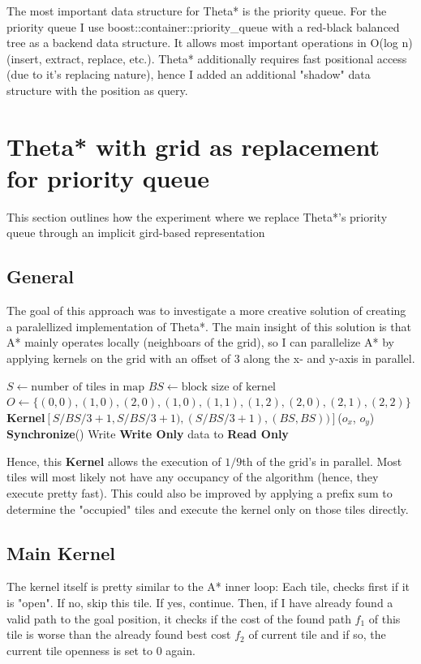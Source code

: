 \documentclass{article}
\begin{document}
The most important data structure for Theta* is the priority queue. For the priority queue I use boost::container::priority\_queue with a red-black balanced tree as a backend data structure. It allows most important operations in O(log n) (insert, extract, replace, etc.). Theta* additionally requires fast positional access (due to it's replacing nature), hence I added an additional "shadow" data structure with the position as query.
%
\section{Theta* with grid as replacement for priority queue}
%
This section outlines how the experiment where we replace Theta*'s priority queue through an implicit gird-based representation
%
\subsection{General}
The goal of this approach was to investigate a more creative solution of creating a paralellized implementation of Theta*. The main insight of this solution is that A* mainly operates locally (neighboars of the grid), so I can parallelize A* by applying kernels on the grid with an offset of 3 along the x- and y-axis in parallel.
\begin{algorithmic}

\State $S \gets \text {number of tiles in map}$
\State $BS \gets \text {block size of kernel}$
\State $O \gets \{(0, 0), (1,0), (2,0), (1,0), (1,1), (1,2), (2,0), (2,1), (2,2)\}$
\State \textbf{Kernel}$[S/BS/3+1, S/BS/3+1), (S / BS / 3 + 1),(BS, BS))]$($o_x$, $o_y$)
\State \textbf{Synchronize}()
\EndFor
\State Write \textbf{Write Only} data to \textbf{Read Only}
\EndWhile
\end{algorithmic}
Hence, this \textbf{Kernel} allows the execution of $1/9$th of the grid's in parallel. Most tiles will most likely not have any occupancy of the algorithm (hence, they execute pretty fast). This could also be improved by applying a prefix sum to determine the "occupied" tiles and execute the kernel only on those tiles directly.
%
\subsection{Main Kernel}
%
The kernel itself is pretty similar to the A* inner loop: Each tile, checks first  if it is "open". If no, skip this tile. If yes, continue. Then, if I have already found a valid path to the goal position, it checks if the cost of the found path $f_1$ of this tile is worse than the already found best cost $f_2$ of current tile and if so, the current tile openness is set to $0$ again.
\end{document}
